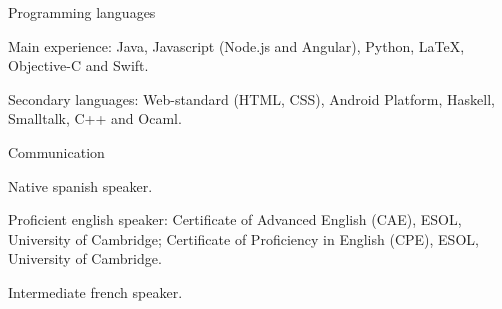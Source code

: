 

\begin{cventries}

\cventry
{Programming languages} %
{} %
{} %
{} %
{
  \begin{cvitems} %
    \item Main experience: Java, Javascript (Node.js and Angular), Python, \LaTeX, Objective-C and Swift. 
    \item Secondary languages: Web-standard (HTML, CSS), Android Platform, Haskell, Smalltalk, C++ and Ocaml.
  \end{cvitems}
}

\cventry
{Communication} %
{} %
{} %
{} %
{
  \begin{cvitems} %
    \item Native spanish speaker. 
    \item Proficient english speaker: Certificate of Advanced English (CAE), ESOL, University of Cambridge; Certificate of Proficiency in English (CPE), ESOL, University of Cambridge.
    \item Intermediate french speaker.
  \end{cvitems}
}

\end{cventries}
